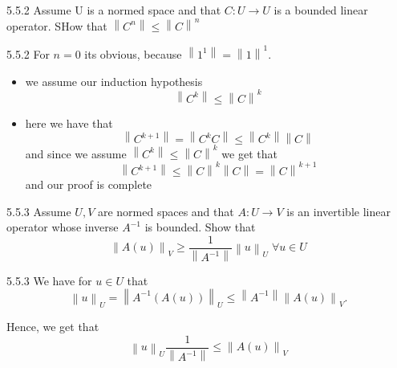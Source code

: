 \documentclass[a4paper,norsk]{article}
\renewcommand{\geq}{\geqslant}
\renewcommand{\leq}{\leqslant}
\begin{document}
\begin{oppgavebox}{5.5.2}{}
Assume U is a normed space and that $ C : U \to U $ is a bounded linear operator. SHow that $ \left\lVert C ^{n}  \right\rVert \leq \left\lVert C \right\rVert ^{n}  $ 
\begin{proofbox}{5.5.2}{}
    For $ n=0$ its obvious, because $ \left\lVert 1 ^{1}  \right\rVert  = \left\lVert 1 \right\rVert ^{1}  $. 
    
    \begin{itemize}
        \item[ $ n=k $ ] we assume our induction hypothesis
        \[
            \left\lVert C ^{k}  \right\rVert \leq \left\lVert C \right\rVert ^{k}  
        \]
        \item[ $ n=k+1 $ ] here we have that 
        \[
            \left\lVert C ^{k+1}   \right\rVert = \left\lVert C ^{k} C \right\rVert  \leq \left\lVert C ^{k}  \right\rVert \left\lVert C \right\rVert 
        \]
        and since we assume $ \left\lVert C ^{k}  \right\rVert \leq \left\lVert C \right\rVert ^{k}  $ we get that
        \[
            \left\lVert C ^{k+1}  \right\rVert \leq \left\lVert C  \right\rVert ^{k} \left\lVert C \right\rVert  = \left\lVert C \right\rVert ^{k+1} 
        \]
        and our proof is complete
    \end{itemize}
\end{proofbox}
\end{oppgavebox}

\begin{oppgavebox}{5.5.3}{}
Assume $ U, V $ are normed spaces and that $ A : U \to V $ is an invertible linear operator whose inverse $ A ^{-1}  $ is bounded. Show that 
\[
    \left\lVert A(u) \right\rVert _V \geq \frac{ 1 }{ \left\lVert A ^{-1} \right\rVert } \left\lVert u \right\rVert _U \; \forall  u \in U
\]
\begin{proofbox}{5.5.3}{}
    We have for $ u \in U $ that
    \[
        \left\lVert u \right\rVert _U = \left\lVert A ^{-1} \left( A(u) \right)   \right\rVert _U \leq \left\lVert A ^{-1}  \right\rVert \left\lVert A(u) \right\rVert _V.
    \]

    Hence, we get that 
    \[
        \left\lVert u \right\rVert _U \frac{ 1 }{ \left\lVert A ^{-1}  \right\rVert  } \leq \left\lVert A(u) \right\rVert _V
    \]
\end{proofbox}
\end{oppgavebox}
\end{document}
